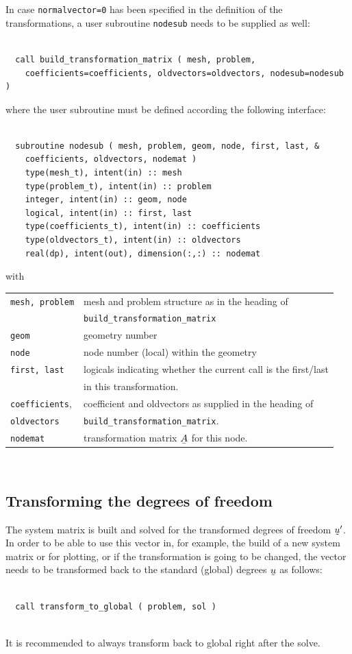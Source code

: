 In case \texttt{normalvector=0} has been specified in the definition of the
transformations, a user subroutine \texttt{nodesub} needs to be supplied as well:
\begin{verbatim}

  call build_transformation_matrix ( mesh, problem,
    coefficients=coefficients, oldvectors=oldvectors, nodesub=nodesub )

\end{verbatim}
where the user subroutine must be defined according the following interface:
\begin{verbatim}

  subroutine nodesub ( mesh, problem, geom, node, first, last, &
    coefficients, oldvectors, nodemat )
    type(mesh_t), intent(in) :: mesh
    type(problem_t), intent(in) :: problem
    integer, intent(in) :: geom, node
    logical, intent(in) :: first, last
    type(coefficients_t), intent(in) :: coefficients
    type(oldvectors_t), intent(in) :: oldvectors
    real(dp), intent(out), dimension(:,:) :: nodemat

\end{verbatim}
with\\[2ex]
\begin{tabular}{ll}
\texttt{mesh, problem} & mesh and problem structure as in the heading of \\
  &\hfill                  \texttt{build\_transformation\_matrix}\\
\texttt{geom} & geometry number \\
\texttt{node} & node number (local) within the geometry\\
\texttt{first, last} & logicals indicating whether the current call
    is the first/last \\ & in this transformation. \\
\texttt{coefficients}, & coefficient and oldvectors as supplied
        in the heading of \\
\texttt{oldvectors} & \hfill \texttt{build\_transformation\_matrix}.\\
\texttt{nodemat} & transformation matrix $\mat A$ for this node.
\end{tabular}\\[2ex]

\subsection{Transforming the degrees of freedom}

The system matrix is built and solved for the transformed degrees of freedom
$\col u'$. In order to be able to use this vector in, for example, the build 
of a new system matrix or for plotting, or if the transformation is going to be changed,
the vector needs to be transformed back
to the standard (global) degrees $\col u$ as follows:
\begin{verbatim}
   
  call transform_to_global ( problem, sol )
  
\end{verbatim}
It is recommended to always transform back to global right after the solve.

